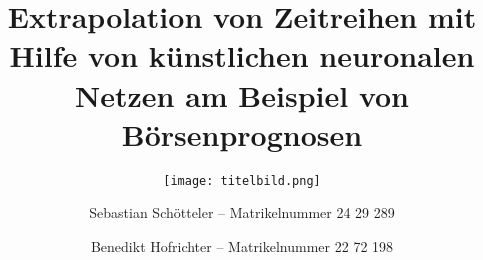 \subject{\Huge Seminararbeit}

\title{Extrapolation von Zeitreihen mit Hilfe von künstlichen neuronalen Netzen am Beispiel von Börsenprognosen}

\author{Sebastian Schötteler -- Matrikelnummer 24 29 289 \and Benedikt Hofrichter -- Matrikelnummer 22 72 198}

\subtitle{\bigskip\bigskip\texttt{[image: titelbild.png]}\bigskip\bigskip} 

\publishers{\texttt{[image: TH-Logo.jpg]}}

\maketitle